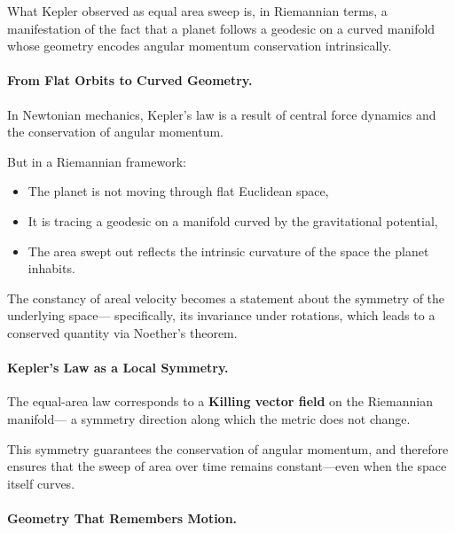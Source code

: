 \begin{tcolorbox}[colback=red!5!white, colframe=red!80!black, title=\textbf{Riemann's View: Kepler as a Geodesic in Curved Space}]
What Kepler observed as equal area sweep is, in Riemannian terms, a manifestation of the fact that a planet follows a geodesic on a curved manifold whose geometry encodes angular momentum conservation intrinsically.
\end{tcolorbox}

\bigskip

\paragraph{From Flat Orbits to Curved Geometry.}

In Newtonian mechanics, Kepler’s law is a result of central force dynamics and the conservation of angular momentum.

But in a Riemannian framework:

\begin{itemize}
  \item The planet is not moving through flat Euclidean space,
  \item It is tracing a geodesic on a manifold curved by the gravitational potential,
  \item The area swept out reflects the intrinsic curvature of the space the planet inhabits.
\end{itemize}

The constancy of areal velocity becomes a statement about the symmetry of the underlying space—  
specifically, its invariance under rotations, which leads to a conserved quantity via Noether’s theorem.

\bigskip

\paragraph{Kepler’s Law as a Local Symmetry.}

The equal-area law corresponds to a \textbf{Killing vector field} on the Riemannian manifold—  
a symmetry direction along which the metric does not change.

This symmetry guarantees the conservation of angular momentum,  
and therefore ensures that the sweep of area over time remains constant—even when the space itself curves.

\bigskip

\paragraph{Geometry That Remembers Motion.}

